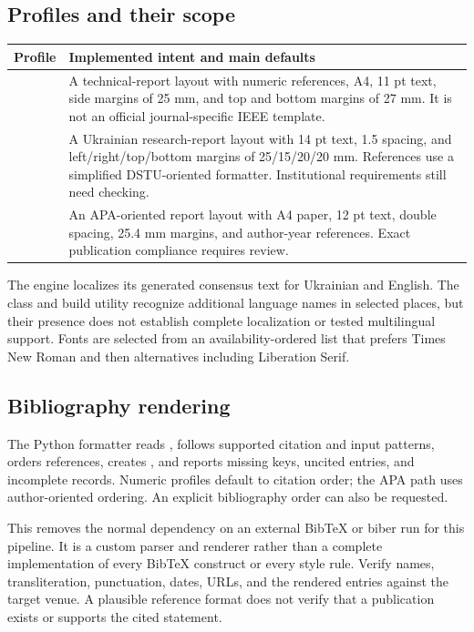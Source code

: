 \documentclass[12pt,a4paper]{article}
\newcommand{\code}[1]{\texttt{\detokenize{#1}}}
\begin{document}
\subsection{Profiles and their scope}
\begin{longtable}{@{}P{22mm}P{137mm}@{}}
\toprule
Profile & Implemented intent and main defaults\\
\midrule\endhead
\code{ieee} & A technical-report layout with numeric references, A4, 11 pt text, side margins of 25 mm, and top and bottom margins of 27 mm. It is not an official journal-specific IEEE template.\\
\code{dstu} & A Ukrainian research-report layout with 14 pt text, 1.5 spacing, and left/right/top/bottom margins of 25/15/20/20 mm. References use a simplified DSTU-oriented formatter. Institutional requirements still need checking.\\
\code{apa} & An APA-oriented report layout with A4 paper, 12 pt text, double spacing, 25.4 mm margins, and author-year references. Exact publication compliance requires review.\\
\bottomrule
\end{longtable}
The engine localizes its generated consensus text for Ukrainian and English. The class and build utility recognize additional language names in selected places, but their presence does not establish complete localization or tested multilingual support. Fonts are selected from an availability-ordered list that prefers Times New Roman and then alternatives including Liberation Serif.

\subsection{Bibliography rendering}
The Python formatter reads \code{refs.bib}, follows supported citation and input patterns, orders references, creates \code{references.tex}, and reports missing keys, uncited entries, and incomplete records. Numeric profiles default to citation order; the APA path uses author-oriented ordering. An explicit bibliography order can also be requested.

This removes the normal dependency on an external BibTeX or biber run for this pipeline. It is a custom parser and renderer rather than a complete implementation of every BibTeX construct or every style rule. Verify names, transliteration, punctuation, dates, URLs, and the rendered entries against the target venue. A plausible reference format does not verify that a publication exists or supports the cited statement.
\end{document}

